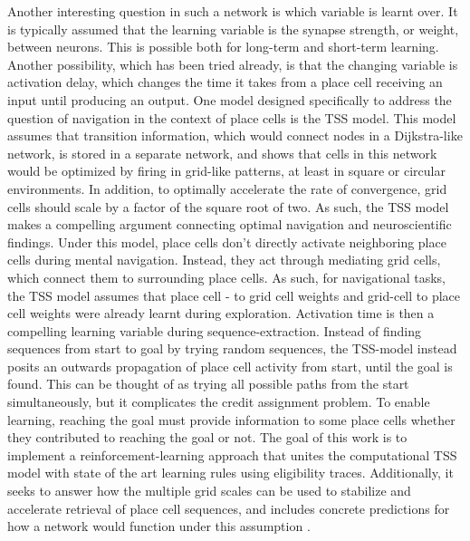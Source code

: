 \documentclass{article}
\begin{document}
    Another interesting question in such a network is which variable is learnt over. It is typically assumed that the learning variable is the synapse strength, or weight, between neurons. This is possible both for long-term and short-term learning. Another possibility, which has been tried already, is that the changing variable is activation delay, which changes the time it takes from a place cell receiving an input until producing an output.
    One model designed specifically to address the question of navigation in the context of place cells is the TSS model. This model assumes that transition information, which would connect nodes in a Dijkstra-like network, is stored in a separate network, and shows that cells in this network would be optimized by firing in grid-like patterns, at least in square or circular environments. In addition, to optimally accelerate the rate of convergence, grid cells should scale by a factor of the square root of two. As such, the TSS model makes a compelling argument connecting optimal navigation and neuroscientific findings.
    Under this model, place cells don't directly activate neighboring place cells during mental navigation. Instead, they act through mediating grid cells, which connect them to surrounding place cells. As such, for navigational tasks, the TSS model assumes that place cell - to grid cell weights and grid-cell to place cell weights were already learnt during exploration. Activation time is then a compelling learning variable during sequence-extraction.
    Instead of finding sequences from start to goal by trying random sequences, the TSS-model instead posits an outwards propagation of place cell activity from start, until the goal is found. This can be thought of as trying all possible paths from the start simultaneously, but it complicates the credit assignment problem. To enable learning, reaching the goal must provide information to some place cells whether they contributed to reaching the goal or not.
    The goal of this work is to implement a reinforcement-learning approach that unites the computational TSS model with state of the art learning rules using eligibility traces. Additionally, it seeks to answer how the multiple grid scales can be used to stabilize and accelerate retrieval of place cell sequences, and includes concrete predictions for how a network would function under this assumption \cite{Barry2006}.

{}

\end{document}
